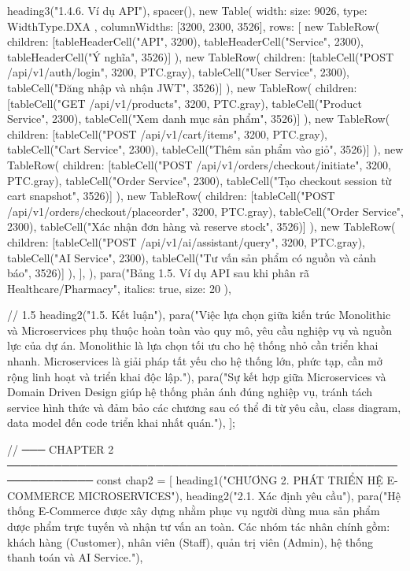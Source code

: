   heading3("1.4.6. Ví dụ API"),
  spacer(),
  new Table({
    width: { size: 9026, type: WidthType.DXA },
    columnWidths: [3200, 2300, 3526],
    rows: [
      new TableRow({ children: [tableHeaderCell("API", 3200), tableHeaderCell("Service", 2300), tableHeaderCell("Ý nghĩa", 3526)] }),
      new TableRow({ children: [tableCell("POST /api/v1/auth/login", 3200, PTC.gray), tableCell("User Service", 2300), tableCell("Đăng nhập và nhận JWT", 3526)] }),
      new TableRow({ children: [tableCell("GET /api/v1/products", 3200, PTC.gray), tableCell("Product Service", 2300), tableCell("Xem danh mục sản phẩm", 3526)] }),
      new TableRow({ children: [tableCell("POST /api/v1/cart/items", 3200, PTC.gray), tableCell("Cart Service", 2300), tableCell("Thêm sản phẩm vào giỏ", 3526)] }),
      new TableRow({ children: [tableCell("POST /api/v1/orders/checkout/initiate", 3200, PTC.gray), tableCell("Order Service", 2300), tableCell("Tạo checkout session từ cart snapshot", 3526)] }),
      new TableRow({ children: [tableCell("POST /api/v1/orders/checkout/placeorder", 3200, PTC.gray), tableCell("Order Service", 2300), tableCell("Xác nhận đơn hàng và reserve stock", 3526)] }),
      new TableRow({ children: [tableCell("POST /api/v1/ai/assistant/query", 3200, PTC.gray), tableCell("AI Service", 2300), tableCell("Tư vấn sản phẩm có nguồn và cảnh báo", 3526)] }),
    ],
  }),
  para("Bảng 1.5. Ví dụ API sau khi phân rã Healthcare/Pharmacy", { italics: true, size: 20 }),

  // 1.5
  heading2("1.5. Kết luận"),
  para("Việc lựa chọn giữa kiến trúc Monolithic và Microservices phụ thuộc hoàn toàn vào quy mô, yêu cầu nghiệp vụ và nguồn lực của dự án. Monolithic là lựa chọn tối ưu cho hệ thống nhỏ cần triển khai nhanh. Microservices là giải pháp tất yếu cho hệ thống lớn, phức tạp, cần mở rộng linh hoạt và triển khai độc lập."),
  para("Sự kết hợp giữa Microservices và Domain Driven Design giúp hệ thống phản ánh đúng nghiệp vụ, tránh tách service hình thức và đảm bảo các chương sau có thể đi từ yêu cầu, class diagram, data model đến code triển khai nhất quán."),
];

// ─── CHAPTER 2 ─────────────────────────────────────────────────────────────
const chap2 = [
  heading1("CHƯƠNG 2. PHÁT TRIỂN HỆ E-COMMERCE MICROSERVICES"),
  heading2("2.1. Xác định yêu cầu"),
  para("Hệ thống E-Commerce được xây dựng nhằm phục vụ người dùng mua sản phẩm dược phẩm trực tuyến và nhận tư vấn an toàn. Các nhóm tác nhân chính gồm: khách hàng (Customer), nhân viên (Staff), quản trị viên (Admin), hệ thống thanh toán và AI Service."),

